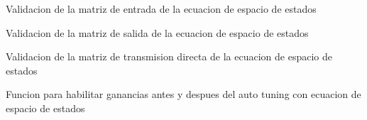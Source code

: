 \documentclass[letterpaper,10pt,spanish]{sphinxmanual}
\begin{document}

\begin{fulllineitems}
\label{\detokenize{codigos/TuningHandler:TuningHandler.ssB_validator}}
Validacion de la matriz de entrada de la ecuacion de espacio de estados

\end{fulllineitems}


\begin{fulllineitems}
\label{\detokenize{codigos/TuningHandler:TuningHandler.ssC_validator}}
Validacion de la matriz de salida de la ecuacion de espacio de estados

\end{fulllineitems}


\begin{fulllineitems}
\label{\detokenize{codigos/TuningHandler:TuningHandler.ssD_validator}}
Validacion de la matriz de transmision directa de la ecuacion de espacio de estados

\end{fulllineitems}


\begin{fulllineitems}
\label{\detokenize{codigos/TuningHandler:TuningHandler.ss_habilitar_sliders_checkbox}}
Funcion para habilitar ganancias antes y despues del auto tuning con ecuacion de espacio de estados

\end{fulllineitems}
\end{document}
